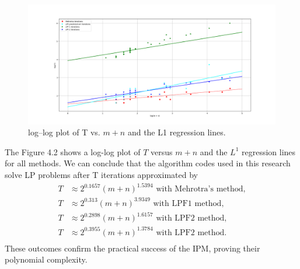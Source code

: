 \documentclass[a4paper,10 pt,titlepage,twoside]{book}
\theoremstyle{plain}
\theoremstyle{definition}
\theoremstyle{remark}
\begin{document}
\begin{figure}\label{figure:T}
	\begin{center}
		\includegraphics[width= 13 cm]{numberiterations}\caption{log–log plot of T vs. $m + n$ and the L1 regression lines.}
	\end{center}
\end{figure}
The Figure 4.2 shows a log-log plot of $T$ versus $m + n$ and the $L^{1}$ regression lines for all methods.
We can conclude that the algorithm codes used in this research solve LP problems after T iterations approximated by
\begin{align*}
T& \approx 2^{0.1657}(m + n)^{1.5394} \text{ with Mehrotra's method,}\\
T &\approx 2^{0.313}(m + n)^{3.9349} \text{ with LPF1 method,}\\
T& \approx 2^{0.2898}(m + n)^{1.6157} \text{ with LPF2 method,}\\
T& \approx 2^{0.3955}(m + n)^{1.3784} \text{ with LPF2 method.}\\
\end{align*}
These outcomes confirm the practical success of the IPM, proving their polynomial complexity. 
%
\end{document}
